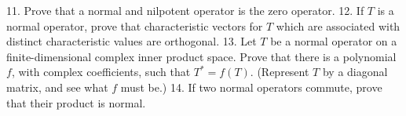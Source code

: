 11. Prove that a normal and nilpotent operator is the zero operator.
12. If \(T\) is a normal operator, prove that characteristic vectors for \(T\) which are associated with distinct characteristic values are orthogonal.
13. Let \(T\) be a normal operator on a finite-dimensional complex inner product space. Prove that there is a polynomial \(f\), with complex coefficients, such that \(T^{*}=f(T)\). (Represent \(T\) by a diagonal matrix, and see what \(f\) must be.)
14. If two normal operators commute, prove that their product is normal.

 